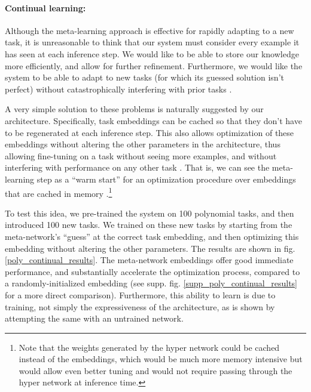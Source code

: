\documentclass{article}
\begin{document}
\paragraph{Continual learning:} Although the meta-learning approach is effective for rapidly adapting to a new task, it is unreasonable to think that our system must consider every example it has seen at each inference step. We would like to be able to store our knowledge more efficiently, and allow for further refinement. Furthermore, we would like the system to be able to adapt to new tasks (for which its guessed solution isn't perfect) without catastrophically interfering with prior tasks \citep{McCloskey1989}. \par
A very simple solution to these problems is naturally suggested by our architecture. Specifically, task embeddings can be cached so that they don't have to be regenerated at each inference step. This also allows optimization of these embeddings without altering the other parameters in the architecture, thus allowing fine-tuning on a task without seeing more examples, and without interfering with performance on any other task \citep[cf.][]{Rumelhart1993, Lampinen2018a}. That is, we can see the meta-learning step as a ``warm start'' for an optimization procedure over embeddings that are cached in memory \citep[cf.][]{Kumaran2016}.\footnote{Note that the weights generated by the hyper network could be cached instead of the embeddings, which would be much more memory intensive but would allow even better tuning and would not require passing through the hyper network at inference time.} \par 
To test this idea, we pre-trained the system on 100 polynomial tasks, and then introduced 100 new tasks. We trained on these new tasks by starting from the meta-network's ``guess'' at the correct task embedding, and then optimizing this embedding without altering the other parameters. The results are shown in fig. \ref{poly_continual_results}. The meta-network embeddings offer good immediate performance, and substantially accelerate the optimization process, compared to a randomly-initialized embedding (see supp. fig. \ref{supp_poly_continual_results} for a more direct comparison). Furthermore, this ability to learn is due to training, not simply the expressiveness of the architecture, as is shown by attempting the same with an untrained network. \par 
\end{document}
